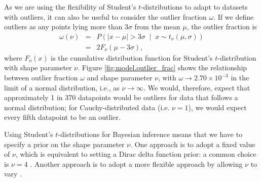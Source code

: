 \documentclass[fleqn,usenatbib]{mnras}
\newcommand{\studentt}[2]{t_\nu \left( #1, #2 \right)}
\begin{document}

As we are using the flexibility of Student's $t$-distributions to adapt to
datasets with outliers, it can also be useful to consider the outlier fraction
$\omega$. If we define outliers as any points lying more than $3\sigma$ from the
mean $\mu$, the outlier fraction is
\begin{eqnarray}
    \omega(\nu)
    &=& P\left(
        \left|x - \mu \right| > 3 \sigma \;
        \middle| \;
        x \sim \studentt{\mu}{\sigma}
    \right) \\
    &=& 2 F_\nu \left(\mu - 3 \sigma \right),
\end{eqnarray}
where $F_\nu(x)$ is the cumulative distribution function for Student's
$t$-distribution with shape parameter $\nu$. Figure \ref{fig:model.outlier_frac}
shows the relationship between outlier fraction $\omega$ and shape parameter
$\nu$, with $\omega \rightarrow 2.70 \times 10^{-3} $ in the limit of a normal
distribution, i.e., as $\nu \rightarrow \infty$. We would, therefore, expect
that approximately 1 in 370 datapoints would be outliers for data that follows a
normal distribution; for Cauchy-distributed data (i.e. $\nu = 1$),
we would expect every fifth datapoint to be an outlier.


Using Student's $t$-distributions for Bayesian inference means that we have to
specify a prior on the shape parameter $\nu$. One approach is to adopt a fixed
value of $\nu$, which is equivalent to setting a Dirac delta function prior: a
common choice is $\nu = 4$ \citep[e.g.][]{Berger:1994, Gelman:2013}.  Another
approach is to adopt a more flexible approach by allowing $\nu$ to vary
\citep[e.g.][]{Juarez:2010, Park:2017, Feeney:2018}.
\end{document}
